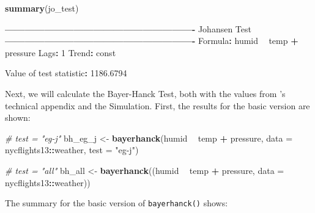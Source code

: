 \documentclass[11pt,a4paper]{article}
\newenvironment{Shaded}{\begin{snugshade}}{\end{snugshade}}
\newcommand{\CommentTok}[1]{\textcolor[rgb]{0.56,0.35,0.01}{\textit{#1}}}
\newcommand{\DataTypeTok}[1]{\textcolor[rgb]{0.13,0.29,0.53}{#1}}
\newcommand{\DecValTok}[1]{\textcolor[rgb]{0.00,0.00,0.81}{#1}}
\newcommand{\FloatTok}[1]{\textcolor[rgb]{0.00,0.00,0.81}{#1}}
\newcommand{\KeywordTok}[1]{\textcolor[rgb]{0.13,0.29,0.53}{\textbf{#1}}}
\newcommand{\NormalTok}[1]{#1}
\newcommand{\OperatorTok}[1]{\textcolor[rgb]{0.81,0.36,0.00}{\textbf{#1}}}
\newcommand{\StringTok}[1]{\textcolor[rgb]{0.31,0.60,0.02}{#1}}
\begin{document}
\begin{Shaded}
\begin{Highlighting}[]
\KeywordTok{summary}\NormalTok{(jo_test)}

\OperatorTok{----------------------------------------------------------}
\NormalTok{Johansen Test}
\OperatorTok{----------------------------------------------------------}
\NormalTok{Formula}\OperatorTok{:}\StringTok{ }\NormalTok{humid }\OperatorTok{~}\StringTok{ }\NormalTok{temp }\OperatorTok{+}\StringTok{ }\NormalTok{pressure}
\NormalTok{Lags}\OperatorTok{:}\StringTok{ }\DecValTok{1}
\NormalTok{Trend}\OperatorTok{:}\StringTok{ }\NormalTok{const}
 
\NormalTok{Value of test statistic}\OperatorTok{:}\StringTok{ }\FloatTok{1186.6794}
\end{Highlighting}
\end{Shaded}

Next, we will calculate the Bayer-Hanck Test, both with the values from
\textcite{Bayerhanck2009}'s technical appendix and the Simulation.
First, the results for the basic version are shown:

\begin{Shaded}
\begin{Highlighting}[]
\CommentTok{# test = "eg-j"}
\NormalTok{bh_eg_j <-}\StringTok{ }\KeywordTok{bayerhanck}\NormalTok{(humid }\OperatorTok{~}\StringTok{ }\NormalTok{temp }\OperatorTok{+}\StringTok{ }\NormalTok{pressure, }
                      \DataTypeTok{data =}\NormalTok{ nycflights13}\OperatorTok{::}\NormalTok{weather, }
                      \DataTypeTok{test =} \StringTok{"eg-j"}\NormalTok{)}

\CommentTok{# test = "all"}
\NormalTok{bh_all <-}\StringTok{ }\KeywordTok{bayerhanck}\NormalTok{((humid }\OperatorTok{~}\StringTok{ }\NormalTok{temp }\OperatorTok{+}\StringTok{ }\NormalTok{pressure, }
                      \DataTypeTok{data =}\NormalTok{ nycflights13}\OperatorTok{::}\NormalTok{weather))}
\end{Highlighting}
\end{Shaded}

The summary for the basic version of \texttt{bayerhanck()} shows:
\end{document}
